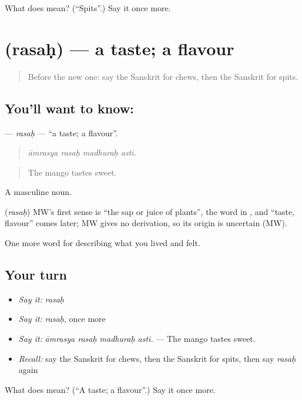 \begin{tcolorbox}[breakable,colback=teal!4,colframe=teal!35!black,title={Before you move on}]
What does  mean? (\textquotedblleft{}Spits\textquotedblright{}.) Say it once more.
\end{tcolorbox}
\section[\texorpdfstring{\sk{रसः} (rasaḥ)}{रसः (rasaḥ)}]{ (rasaḥ) — a taste; a flavour}

\label{lesson:SA-C472-rasah}



\begin{quote}
Before the new one: say the Sanskrit for chews, then the Sanskrit for spits.
\end{quote}

\subsection*{You'll want to know: }
\textbf{} — \emph{rasaḥ} — \textquotedblleft{}a taste; a flavour\textquotedblright{}.

\begin{quote}
   
\end{quote}

\begin{quote}
\emph{āmrasya rasaḥ madhuraḥ asti.}
\end{quote}

\begin{quote}
The mango tastes sweet.
\end{quote}

A masculine noun.

\begin{cousinweb}
\textbf{} (\emph{rasaḥ}) MW's first sense is \textquotedblleft{}the sap or juice of plants\textquotedblright{}, the word in \textbf{}, and \textquotedblleft{}taste, flavour\textquotedblright{} comes later; MW gives no derivation, so its origin is uncertain (MW).
\end{cousinweb}

\begin{grammarlens}[title={What you've built}]
One more word for describing what you lived and felt.
\end{grammarlens}

\subsection*{Your turn}
\begin{itemize}
\raggedright
  \item \emph{Say it:} \emph{rasaḥ}
  \item \emph{Say it:} \emph{rasaḥ}, once more
  \item \emph{Say it:} \emph{āmrasya rasaḥ madhuraḥ asti.} — The mango tastes sweet.
  \item \emph{Recall:} say the Sanskrit for chews, then the Sanskrit for spits, then say \emph{rasaḥ} again
\end{itemize}

\begin{tcolorbox}[breakable,colback=teal!4,colframe=teal!35!black,title={Before you move on}]
What does  mean? (\textquotedblleft{}A taste; a flavour\textquotedblright{}.) Say it once more.
\end{tcolorbox}
